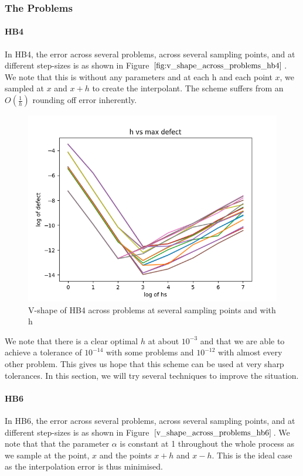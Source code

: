 \documentclass{article}
\begin{document}
\subsubsection{The Problems}
\paragraph{HB4}
In HB4, the error across several problems, across several sampling points, and at different step-sizes is as shown in Figure $\ref{fig:v_shape_across_problems_hb4}$. We note that this is without any parameters and at each h and each point $x$, we sampled at $x$ and $x + h$ to create the interpolant. The scheme suffers from an $O(\frac{1}{h})$ rounding off error inherently.
\begin{figure}[H]
\centering
\includegraphics[width=0.7\linewidth]{./figures/v_shape_across_problems_hb4}
\caption{V-shape of HB4 across problems at several sampling points and with h}
\label{fig:v_shape_across_problems_hb4}
\end{figure}

We note that there is a clear optimal $h$ at about $10^{-3}$ and that we are able to achieve a tolerance of  $10^{-14}$ with some problems and $10^{-12}$ with almost every other problem. This gives us hope that this scheme can be used at very sharp tolerances. In this section, we will try several techniques to improve the situation. 


\paragraph{HB6}
In HB6, the error across several problems, across several sampling points, and at different step-sizes is as shown in Figure $\ref{v_shape_across_problems_hb6}$. We note that that the parameter $\alpha$ is constant at 1 throughout the whole process as we sample at the point, $x$ and the points $x+h$ and $x-h$. This is the ideal case as the interpolation error is thus minimised.
\end{document}
